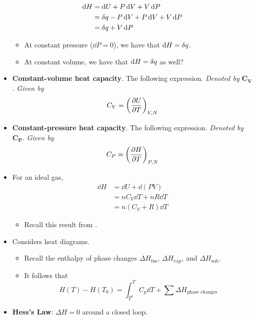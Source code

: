 \documentclass[../notes.tex]{subfiles}
\begin{document}
\begin{itemize}
\begin{align*}
        \dd{H} &= \dd{U}+P\dd{V}+V\dd{P}\\
        &= \var{q}-P\dd{V}+P\dd{V}+V\dd{P}\\
        &= \var{q}+V\dd{P}
    \end{align*}
    \begin{itemize}
        \item At constant pressure ($\dd{P}=0$), we have that $\dd{H}=\var{q}$.
        \item At constant volume, we have that $\dd{H}=\var{q}$ as well?
    \end{itemize}
    \item \textbf{Constant-volume heat capacity}. The following expression. \emph{Denoted by} $\bm{C_V}$. \emph{Given by}
    \begin{equation*}
        C_V = \left( \pdv{U}{T} \right)_{V,N}
    \end{equation*}
    \item \textbf{Constant-pressure heat capacity}. The following expression. \emph{Denoted by} $\bm{C_P}$. \emph{Given by}
    \begin{equation*}
        C_P = \left( \pdv{H}{T} \right)_{P,N}
    \end{equation*}
    \item For an ideal gas,
    \begin{align*}
        \dd{H} &= \dd{U}+\dd{(PV)}\\
        &= nC_V\dd{T}+nR\dd{T}\\
        &= n(C_V+R)\dd{T}
    \end{align*}
    \begin{itemize}
        \item Recall this result from \textcite{bib:PHYS13300Notes}.
    \end{itemize}
    \item Considers heat diagrams.
    \begin{itemize}
        \item Recall the enthalpy of phase changes $\Delta H_\text{fus}$, $\Delta H_\text{vap}$, and $\Delta H_\text{sub}$.
        \item It follows that
        \begin{equation*}
            H(T)-H(T_0) = \int_{T^0}^TC_p\dd{T}+\sum\Delta H_\text{phase changes}
        \end{equation*}
    \end{itemize}
    \item \textbf{Hess's Law}: $\Delta H=0$ around a closed loop.
    \begin{itemize}

\end{itemize}
\end{itemize}
\end{document}
